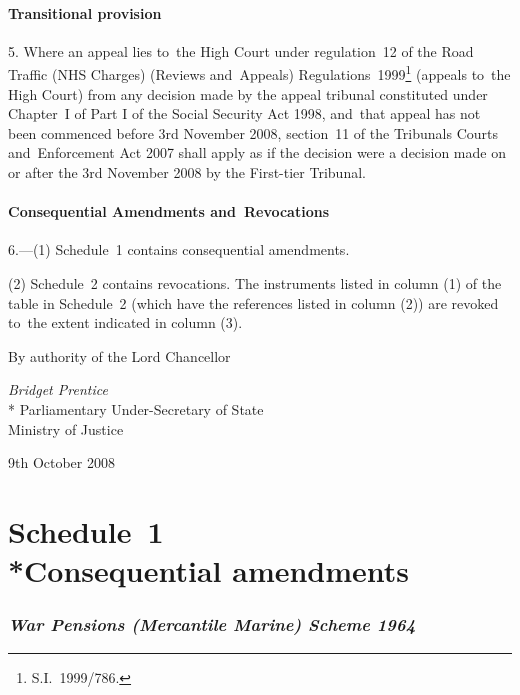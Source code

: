 \documentclass[12pt,a4paper]{article}
\begin{document}
\subsection[5. Transitional provision]{Transitional provision}

5.  Where an appeal lies to~the High Court under regulation~12 of the Road Traffic (NHS Charges) (Reviews and~Appeals) Regulations~1999\footnote{S.I.~1999/786.} (appeals to~the High Court) from any decision made by the appeal tribunal constituted under Chapter~I of Part I of the Social Security Act 1998, and~that appeal has not been commenced before 3rd November 2008, section~11 of the Tribunals Courts and~Enforcement Act 2007 shall apply as if the decision were a decision made on or after the 3rd November 2008 by the First-tier Tribunal.

\subsection[6. Consequential Amendments and~Revocations]{Consequential Amendments and~Revocations}

6.---(1)  Schedule~1 contains consequential amendments.

(2) Schedule~2 contains revocations. The instruments listed in column (1) of the table in Schedule~2 (which have the references listed in column (2)) are revoked to~the extent indicated in column (3). 

\bigskip

By authority of the Lord Chancellor

{\raggedleft
\emph{Bridget Prentice}\\*
Parliamentary Under-Secretary 
of State\\%
Ministry of Justice

}

9th October 2008

\small

\part[Schedule~1 --- Consequential amendments]{Schedule~1\\*Consequential amendments}

\renewcommand\parthead{--- Schedule~1}

\section*{\itshape War Pensions (Mercantile Marine) Scheme 1964}
\end{document}

